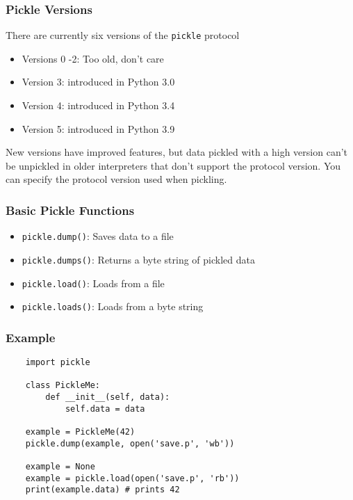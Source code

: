 \documentclass[10pt]{beamer}
\begin{document}
\begin{frame}
  \frametitle{Pickle Versions}
  
  There are currently six versions of the \texttt{pickle} protocol
  
  \begin{itemize}
    \item Versions 0 -2: Too old, don't care
    \item Version 3: introduced in Python 3.0
    \item Version 4: introduced in Python 3.4
    \item Version 5: introduced in Python 3.9
  \end{itemize}
  
  New versions have improved features, but data pickled with a high version
  can't be unpickled in older interpreters that don't support the protocol version.
  You can specify the protocol version used when pickling.
    
  \end{frame}

\begin{frame}
  \frametitle{Basic Pickle Functions}
  
  
  
  \begin{itemize}
    \item \texttt{pickle.dump()}: Saves data to a file
    \item \texttt{pickle.dumps()}: Returns a byte string of pickled data
    \item \texttt{pickle.load()}: Loads from a file
    \item \texttt{pickle.loads()}: Loads from a byte string
  \end{itemize}
  
  
    
  \end{frame}


\begin{frame}[fragile]
  \frametitle{Example}
  
  \begin{verbatim}
    import pickle
    
    class PickleMe:
        def __init__(self, data):
            self.data = data
    
    example = PickleMe(42)
    pickle.dump(example, open('save.p', 'wb'))
    
    example = None
    example = pickle.load(open('save.p', 'rb'))
    print(example.data) # prints 42       
    
   \end{verbatim} 
    
\end{frame}
\end{document}
